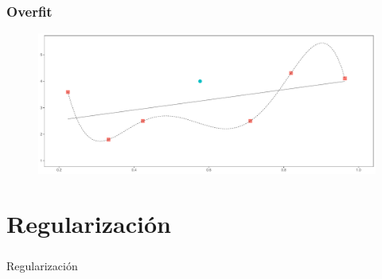 \documentclass[
  shownotes,
  xcolor={svgnames},
  hyperref={colorlinks,citecolor=DarkBlue,linkcolor=DarkRed,urlcolor=DarkBlue}
  , aspectratio=169]{beamer}
\begin{document}
\begin{frame}
\frametitle{Overfit}


        \begin{figure}[H] \centering
            \captionsetup{justification=centering}
              \includegraphics[scale=0.4]{figures/fig_1h.pdf}
 \end{figure}

\end{frame}

\section{Regularización}

\begin{frame}[fragile]
\frametitle{}


\centering
{\huge \textcolor{andesred}{Regularización}}



\end{frame}

\end{document}
